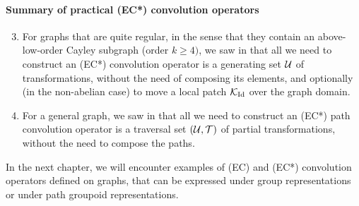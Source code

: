 \paragraph{Summary of practical (EC*) convolution operators}
\begin{enumerate}
  \setcounter{enumi}{2}
\item For graphs that are quite regular, in the sense that they contain an above-low-order Cayley subgraph (order $k \geq 4)$, we saw in  that all we need to construct an (EC*) convolution operator is a generating set $\mathcal{U}$ of transformations, without the need of composing its elements, and optionally (in the non-abelian case) to move a local patch $\mathcal{K}_{\operatorname{Id}}$ over the graph domain.
\item For a general graph, we saw in  that all we need to construct an (EC*) path convolution operator is a traversal set $(\mathcal{U}, \mathcal{T})$ of partial transformations, without the need to compose the paths.
\end{enumerate}

In the next chapter, we will encounter examples of (EC) and (EC*) convolution operators defined on graphs, that can be expressed under group representations or under path groupoid representations.
